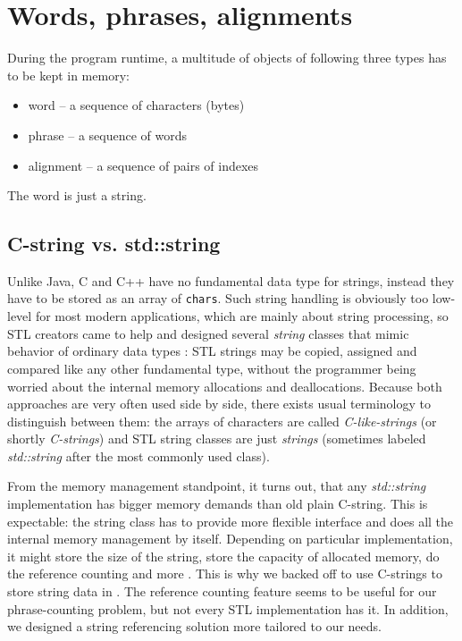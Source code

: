 


\section{Words, phrases, alignments}


During the program runtime, a multitude of objects of following three types has to be
kept in memory:
\begin{itemize}
  \item word -- a sequence of characters (bytes)
  \item phrase -- a sequence of words
  \item alignment -- a sequence of pairs of indexes
\end{itemize}

The word is just a string.

\subsection{C-string vs. std::string}

Unlike Java, C and C++ have no fundamental data type for strings, instead they have to be
stored as an array of \verb|chars|.
Such string handling is obviously too low-level for most modern applications,
which are mainly about string processing, so STL creators came to help and designed several
\emph{string} classes that mimic behavior of ordinary data types \citep[Chapter 11]{josuttis:stl}:
STL strings may be copied, assigned and compared like any other fundamental type,
without the programmer being worried about the internal memory allocations and deallocations.
Because both approaches are very often used side by side, there exists usual terminology to
distinguish between them:
the arrays of characters are called \emph{C-like-strings} (or shortly \emph{C-strings}) and
STL string classes are just \emph{strings} (sometimes labeled \emph{std::string} after the
most commonly used class).

From the memory management standpoint, it turns out, that any \emph{std::string} implementation
has bigger memory demands than old plain C-string.
This is expectable: the string class has to provide more flexible interface and does all
the internal memory management by itself. Depending on particular implementation, it might
store the size of the string, store the capacity of allocated memory, do the reference counting
and more \citep[Item 15]{meyers:effectivestl}.
This is why we backed off to use C-strings to store string data in \eppex{}.
The reference counting feature seems to be useful for our phrase-counting problem,
but not every STL implementation has it.
In addition, we designed a string referencing solution more tailored to our needs.

